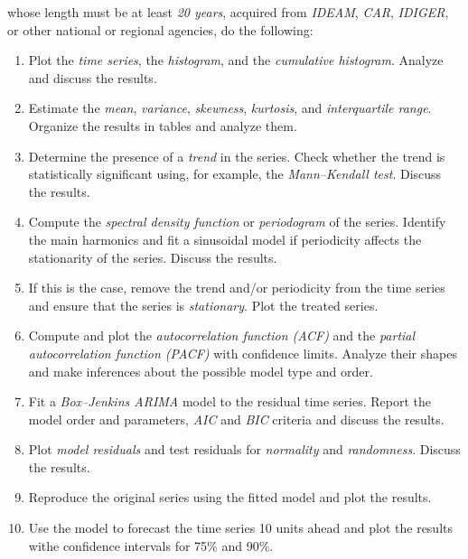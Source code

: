 \documentclass[10pt, a4paper]{exam}
\begin{document}
whose length must be at least \emph{20 years}, acquired from \emph{IDEAM}, \emph{CAR}, \emph{IDIGER}, or other national or regional agencies, do the following:

\begin{enumerate}

\item Plot the \emph{time series}, the \emph{histogram}, and the \emph{cumulative histogram}. Analyze and discuss the results.

\item Estimate the \emph{mean}, \emph{variance}, \emph{skewness}, \emph{kurtosis}, and \emph{interquartile range}. Organize the results in tables and analyze them.

\item Determine the presence of a \emph{trend} in the series. Check whether the trend is statistically significant using, for example, the \emph{Mann–Kendall test}. Discuss the results.

\item Compute the \emph{spectral density function} or \emph{periodogram} of the series. Identify the main harmonics and fit a sinusoidal model if periodicity affects the stationarity of the series. Discuss the results.

\item If this is the case, remove the trend and/or periodicity from the time series and ensure that the series is \emph{stationary}. Plot the treated series.

\item Compute and plot the \emph{autocorrelation function (ACF)} and the \emph{partial autocorrelation function (PACF)} with confidence limits. Analyze their shapes and make inferences about the possible model type and order.

\item Fit a \emph{Box–Jenkins ARIMA} model to the residual time series. Report the model order and parameters, \emph{AIC} and \emph{BIC} criteria and discuss the results.

\item Plot \emph{model residuals} and test residuals for \emph{normality} and \emph{randomness}. Discuss the results. 

\item Reproduce the original series using the fitted model and plot the results.

\item Use the model to forecast the time series 10 units ahead and plot the results withe confidence intervals for 75\% and 90\%.

\end{enumerate}
  
\end{document}
